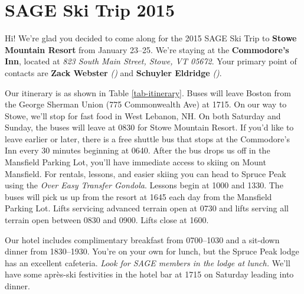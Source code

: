 

\usepackage[scaled]{helvet}
\renewcommand\familydefault{\sfdefault}
\usepackage[top=0.5in,bottom=0.5in,outer=0.5in,inner=0.5in,landscape]{geometry}
\usepackage{multicol}

\pagestyle{empty}


\twocolumn

\section*{SAGE Ski Trip 2015}
Hi!
We're glad you decided to come along for the 2015 SAGE Ski Trip to \textbf{Stowe Mountain Resort} from January 23--25.
We're staying at the \textbf{Commodore's Inn}, located at \emph{823 South Main Street, Stowe, VT 05672}.
Your primary point of contacts are \textbf{Zack Webster} \emph{(\missingdata)} and \textbf{Schuyler Eldridge} \emph{(\missingdata)}.

Our itinerary is as shown in Table \ref{tab-itinerary}.
Buses will leave Boston from the George Sherman Union (775 Commonwealth Ave) at 1715.
On our way to Stowe, we'll stop for fast food in West Lebanon, NH.
On both Saturday and Sunday, the buses will leave at 0830 for Stowe Mountain Resort.
If you'd like to leave earlier or later, there is a free shuttle bus that stops at the Commodore's Inn every 30 minutes beginning at 0640.
After the bus drops us off in the Mansfield Parking Lot, you'll have immediate access to skiing on Mount Mansfield.
For rentals, lessons, and easier skiing you can head to Spruce Peak using the \emph{Over Easy Transfer Gondola}.
Lessons begin at 1000 and 1330.
The buses will pick us up from the resort at 1645 each day from the Mansfield Parking Lot.
Lifts servicing advanced terrain open at 0730 and lifts serving all terrain open between 0830 and 0900. Lifts close at 1600.

Our hotel includes complimentary breakfast from 0700--1030 and a sit-down dinner from 1830--1930.
You're on your own for lunch, but the Spruce Peak lodge has an excellent cafeteria.
\emph{Look for SAGE members in the lodge at lunch.}
We'll have some apr\`es-ski festivities in the hotel bar at 1715 on Saturday leading into dinner.

